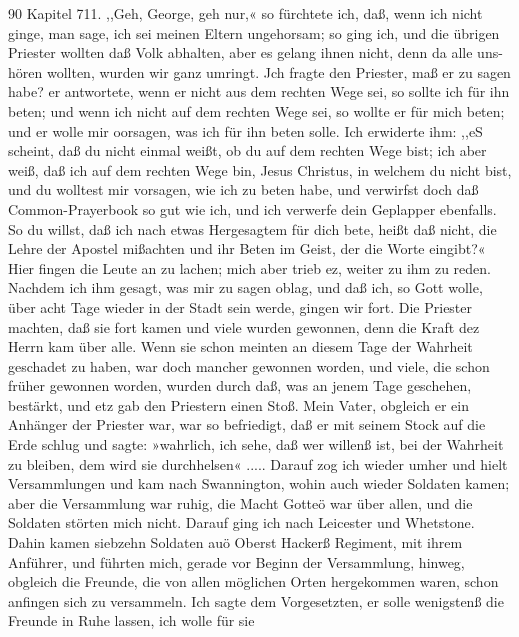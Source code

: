 
90 Kapitel 711.
,,Geh, George, geh nur,« so fürchtete ich, daß, wenn ich nicht
ginge, man sage, ich sei meinen Eltern ungehorsam; so ging ich,
und die übrigen Priester wollten daß Volk abhalten, aber es
gelang ihnen nicht, denn da alle uns- hören wollten, wurden wir
ganz umringt. Jch fragte den Priester, maß er zu sagen habe?
er antwortete, wenn er nicht aus dem rechten Wege sei, so sollte
ich für ihn beten; und wenn ich nicht auf dem rechten Wege sei,
so wollte er für mich beten; und er wolle mir oorsagen, was ich
für ihn beten solle. Ich erwiderte ihm: ,,eS scheint, daß du nicht
einmal weißt, ob du auf dem rechten Wege bist; ich aber weiß,
daß ich auf dem rechten Wege bin, Jesus Christus, in welchem
du nicht bist, und du wolltest mir vorsagen, wie ich zu beten
habe, und verwirfst doch daß Common-Prayerbook so gut wie ich,
und ich verwerfe dein Geplapper ebenfalls. So du willst, daß ich
nach etwas Hergesagtem für dich bete, heißt daß nicht, die Lehre
der Apostel mißachten und ihr Beten im Geist, der die Worte
eingibt?« Hier fingen die Leute an zu lachen; mich aber trieb
ez, weiter zu ihm zu reden. Nachdem ich ihm gesagt, was
mir zu sagen oblag, und daß ich, so Gott wolle, über acht Tage wieder
in der Stadt sein werde, gingen wir fort. Die Priester machten,
daß sie fort kamen und viele wurden gewonnen, denn die Kraft dez
Herrn kam über alle. Wenn sie schon meinten an diesem Tage
der Wahrheit geschadet zu haben, war doch mancher gewonnen
worden, und viele, die schon früher gewonnen worden, wurden durch
daß, was an jenem Tage geschehen, bestärkt, und etz gab den
Priestern einen Stoß. Mein Vater, obgleich er ein Anhänger der
Priester war, war so befriedigt, daß er mit seinem Stock auf die
Erde schlug und sagte: »wahrlich, ich sehe, daß wer willenß ist,
bei der Wahrheit zu bleiben, dem wird sie durchhelsen« .....
Darauf zog ich wieder umher und hielt Versammlungen und
kam nach Swannington, wohin auch wieder Soldaten kamen;
aber die Versammlung war ruhig, die Macht Gotteö war
über allen, und die Soldaten störten mich nicht. Darauf ging
ich nach Leicester und Whetstone. Dahin kamen siebzehn Soldaten
auö Oberst Hackerß Regiment, mit ihrem Anführer, und führten
mich, gerade vor Beginn der Versammlung, hinweg, obgleich die
Freunde, die von allen möglichen Orten hergekommen waren,
schon anfingen sich zu versammeln. Ich sagte dem Vorgesetzten,
er solle wenigstenß die Freunde in Ruhe lassen, ich wolle für sie


